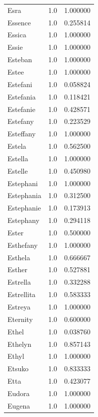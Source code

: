 \documentclass[
  letterpaper,
  DIV=11,
  numbers=noendperiod]{scrreprt}
\begin{document}
\begin{tabular}{lrr}
Esra            &   1.0 &   1.000000 \\
Essence         &   1.0 &   0.255814 \\
Essica          &   1.0 &   1.000000 \\
Essie           &   1.0 &   1.000000 \\
Esteban         &   1.0 &   1.000000 \\
Estee           &   1.0 &   1.000000 \\
Estefani        &   1.0 &   0.058824 \\
Estefania       &   1.0 &   0.118421 \\
Estefanie       &   1.0 &   0.428571 \\
Estefany        &   1.0 &   0.223529 \\
Esteffany       &   1.0 &   1.000000 \\
Estela          &   1.0 &   0.562500 \\
Estella         &   1.0 &   1.000000 \\
Estelle         &   1.0 &   0.450980 \\
Estephani       &   1.0 &   1.000000 \\
Estephania      &   1.0 &   0.312500 \\
Estephanie      &   1.0 &   0.173913 \\
Estephany       &   1.0 &   0.294118 \\
Ester           &   1.0 &   0.500000 \\
Esthefany       &   1.0 &   1.000000 \\
Esthela         &   1.0 &   0.666667 \\
Esther          &   1.0 &   0.527881 \\
Estrella        &   1.0 &   0.332288 \\
Estrellita      &   1.0 &   0.583333 \\
Estreya         &   1.0 &   1.000000 \\
Eternity        &   1.0 &   0.600000 \\
Ethel           &   1.0 &   0.038760 \\
Ethelyn         &   1.0 &   0.857143 \\
Ethyl           &   1.0 &   1.000000 \\
Etsuko          &   1.0 &   0.833333 \\
Etta            &   1.0 &   0.423077 \\
Eudora          &   1.0 &   1.000000 \\
Eugena          &   1.0 &   1.000000 \\

\end{tabular}
\end{document}
